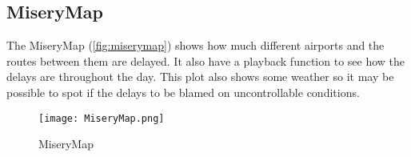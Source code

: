 \subsection{MiseryMap}
\label{subsection:zugmonitor}

The MiseryMap (\vref{fig:miserymap}) shows how much different airports and 
the routes between them are delayed. It also have a playback function to see
how the delays are throughout the day. This plot also shows some weather so it
may be possible to spot if the delays to be blamed on uncontrollable
conditions. 

\begin{figure}[!htbp]
	\texttt{[image: MiseryMap.png]}
	\caption[MiseryMap]{MiseryMap \cite{flightAware:MiseryMap}}
	\label{fig:miserymap}
\end{figure}
\pagebreak
 
